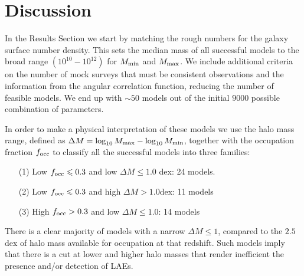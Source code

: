 \documentclass[usenatbib]{mn2e}
\newcommand{\hMsun}{{\ifmmode{h^{-1}{\rm
        {M_{\odot}}}}\else{$h^{-1}{\rm{M_{\odot}}}$}\fi}}
\begin{document}






\section{Discussion}

In the Results Section we start by matching the rough numbers for the
galaxy surface number density. This sets the median mass of all
successful models to the broad range $(10^{10}-10^{12})$ \hMsun for
$M_{\rm min}$ and $M_{\rm max}$. We include additional criteria on the
number of mock surveys that must be consistent observations
and the information from the angular correlation function, reducing
the number of feasible models. We end up with $\sim 50$ models out of
the initial $9000$ possible combination of parameters. 

In order to make a physical interpretation of these models we use 
the halo mass range, defined as $\Delta M=\log_{10}M_{\rm max} -
\log_{10}M_{\rm  min}$, together with the occupation fraction $f_{\rm
  occ}$ to classify all the successful models into three families:  


\begin{itemize}
\item[(1)] Low $f_{\rm occ}\leq 0.3$ and low $\Delta M\leq 1.0$
  dex: 24 models.
\item[(2)] Low $f_{\rm occ}\leq 0.3$ and high $\Delta M > 1.0$dex: 11
  models
\item[(3)] High $f_{\rm occ}> 0.3$ and low $\Delta M\leq 1.0$: 14 models
\end{itemize}

There is a clear majority of models with a narrow $\Delta M\leq
1$, compared to the $2.5$dex of halo mass available for occupation at
that redshift. Such models imply that there is a cut at lower and higher halo
masses that render inefficient the presence and/or detection of LAEs.
\end{document}
